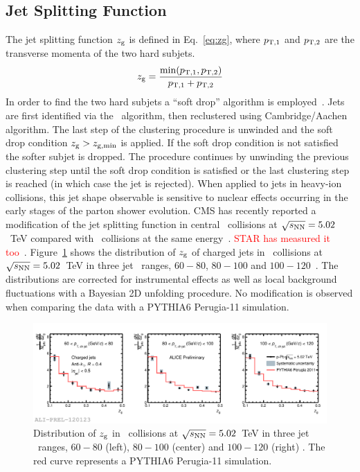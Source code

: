 \documentclass[10pt]{article}
\begin{document}
\subsection{Jet Splitting Function}
The jet splitting function $z_{\rm g}$ is defined in Eq.~\ref{eq:zg}, where $p_{\rm T,1}$ and $p_{\rm T,2}$ are the transverse momenta
of the two hard subjets.
\begin{equation}
z_{\rm g} = \frac{\min({p_{\rm T,1},p_{\rm T,2}})}{p_{\rm T,1}+p_{\rm T,2}}
\label{eq:zg}
\end{equation}
In order to find the two hard subjets a ``soft drop'' algorithm is employed~\cite{Larkoski:2014, Larkoski:2015}. Jets are first identified via the \antikt\ algorithm, then reclustered using Cambridge/Aachen algorithm.
The last step of the clustering procedure is unwinded and the soft drop condition $z_{\rm g} > z_{\rm g, min}$ is applied. If the soft drop condition is not satisfied the softer subjet is dropped.
The procedure continues by unwinding the previous clustering step until the soft drop condition is satisfied or the last clustering step is reached (in which case the jet is rejected).
When applied to jets in heavy-ion collisions, this jet shape observable is sensitive to nuclear effects occurring in the early stages of the parton shower evolution.
CMS has recently reported a modification of the jet splitting function in central \PbPb\ collisions at $\sqrt{s_{\rm NN}}=5.02$~TeV compared with
\pp\ collisions at the same energy~\cite{CMS:2017a}.
\textcolor{red}{STAR has measured it too}~\cite{Kauder:2017}.
Figure~\ref{fig:zgppb} shows the distribution of $z_{\rm g}$ of charged jets in \pPb\ collisions at $\sqrt{s_{\rm NN}}=5.02$~TeV in three jet \pt\ ranges, $60-80$, $80-100$ and $100-120$~\GeVc. 
The distributions are corrected for instrumental effects as well as local background fluctuations with a Bayesian 2D unfolding procedure.
No modification is observed when comparing the data with a PYTHIA6 Perugia-11 simulation.
\begin{figure}[tb]
\centering
\includegraphics[width=.85\textwidth]{img/2017-Feb-01-zg_unfolded_20GeV_ALL}
\caption{Distribution of $z_{\rm g}$ in \pPb\ collisions at $\sqrt{s_{\rm NN}}=5.02$~TeV in three jet \pt\ ranges, $60-80$ (left), $80-100$ (center) and $100-120$ (right) \GeVc.
The red curve represents a PYTHIA6 Perugia-11 simulation.}
\label{fig:zgppb}
\end{figure}
\end{document}
